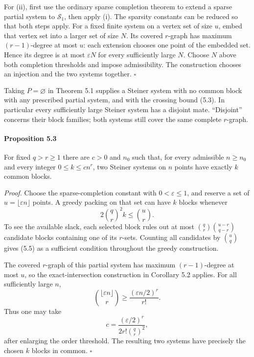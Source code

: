 \documentclass[english,11pt,a4paper]{article}
\begin{document}
For (ii), first use the ordinary sparse completion theorem to extend a sparse partial system to \(\mathcal S_1\), then apply (i). The sparsity constants can be reduced so that both steps apply. For a fixed finite system on a vertex set of size \(u\), embed that vertex set into a larger set of size \(N\). Its covered \(r\)-graph has maximum \((r-1)\)-degree at most \(u\): each extension chooses one point of the embedded set. Hence its degree is at most \(\varepsilon N\) for every sufficiently large \(N\). Choose \(N\) above both completion thresholds and impose admissibility. The construction chooses an injection and the two systems together. \(\square\)

Taking \(P=\varnothing\) in Theorem 5.1 supplies a Steiner system with no common block with any prescribed partial system, and with the crossing bound (5.3). In particular every sufficiently large Steiner system has a disjoint mate. ``Disjoint'' concerns their block families; both systems still cover the same complete \(r\)-graph.

\par
\begin{samepage}
\paragraph{Proposition 5.3}\label{proposition-5.3}

For fixed \(q>r\ge1\) there are \(c>0\) and \(n_0\) such that, for every admissible \(n\ge n_0\) and every integer \(0\le k\le c n^r\), two Steiner systems on \(n\) points have exactly \(k\) common blocks.

\end{samepage}
\emph{Proof.} Choose the sparse-completion constant with \(0<\varepsilon\le1\), and reserve a set of \(u=\lfloor\varepsilon n\rfloor\) points. A greedy packing on that set can have \(k\) blocks whenever \[2\binom qr^2 k\le\binom ur.
\tag{5.5}\] To see the available slack, each selected block rules out at most \(\binom qr\binom{u-r}{q-r}\) candidate blocks containing one of its \(r\)-sets. Counting all candidates by \(\binom uq\) gives (5.5) as a sufficient condition throughout the greedy construction.

The covered \(r\)-graph of this partial system has maximum \((r-1)\)-degree at most \(u\), so the exact-intersection construction in Corollary 5.2 applies. For all sufficiently large \(n\), \[\binom{\lfloor\varepsilon n\rfloor}{r}
\ge\frac{(\varepsilon n/2)^r}{r!}.\] Thus one may take \[c=\frac{(\varepsilon/2)^r}{2r!\binom qr^2},
\tag{5.6}\] after enlarging the order threshold. The resulting two systems have precisely the chosen \(k\) blocks in common. \(\square\)
\end{document}

